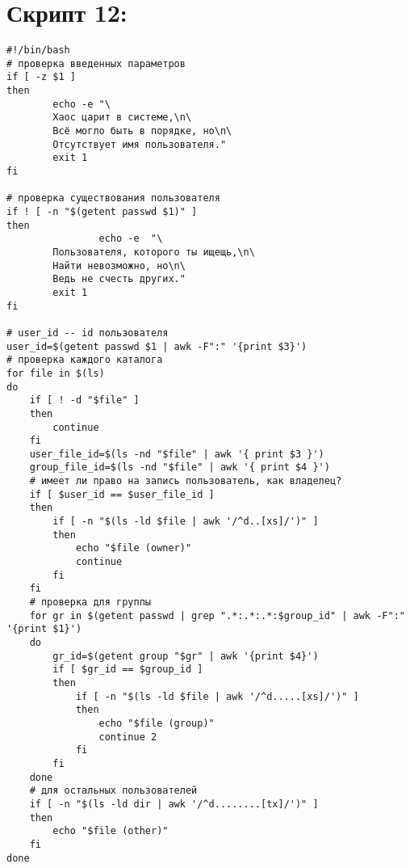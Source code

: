 \documentclass[12pt, a4paper]{article}
\begin{document}
\section*{Скрипт 12:}
\begin{verbatim}
#!/bin/bash
# проверка введенных параметров
if [ -z $1 ]
then
        echo -e "\
        Хаос царит в системе,\n\
        Всё могло быть в порядке, но\n\
        Отсутствует имя пользователя."
        exit 1
fi

# проверка существования пользователя
if ! [ -n "$(getent passwd $1)" ] 
then
				echo -e  "\
        Пользователя, которого ты ищещь,\n\
        Найти невозможно, но\n\
        Ведь не счесть других."
        exit 1
fi

# user_id -- id пользователя 
user_id=$(getent passwd $1 | awk -F":" '{print $3}')
# проверка каждого каталога
for file in $(ls) 
do
	if [ ! -d "$file" ]
	then
		continue
	fi
	user_file_id=$(ls -nd "$file" | awk '{ print $3 }')
	group_file_id=$(ls -nd "$file" | awk '{ print $4 }')
	# имеет ли право на запись пользователь, как владелец?
	if [ $user_id == $user_file_id ]
	then
		if [ -n "$(ls -ld $file | awk '/^d..[xs]/')" ]
		then
			echo "$file (owner)"
			continue
		fi
	fi
	# проверка для группы
	for gr in $(getent passwd | grep ".*:.*:.*:$group_id" | awk -F":" '{print $1}')
	do
		gr_id=$(getent group "$gr" | awk '{print $4}')
		if [ $gr_id == $group_id ]
		then
			if [ -n "$(ls -ld $file | awk '/^d.....[xs]/')" ]
			then
				echo "$file (group)"
				continue 2
			fi
		fi
	done
	# для остальных пользователей
	if [ -n "$(ls -ld dir | awk '/^d........[tx]/')" ]
	then
		echo "$file (other)"
	fi
done

\end{verbatim}
\end{document}
